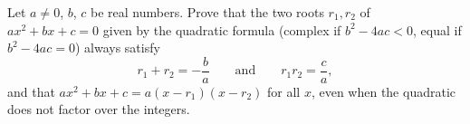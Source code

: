 Let $a\ne0$, $b$, $c$ be real numbers. Prove that the two roots $r_1,r_2$ of $ax^2+bx+c=0$ given by the quadratic formula (complex if $b^2-4ac<0$, equal if $b^2-4ac=0$) always satisfy
\[
r_1+r_2=-\dfrac{b}{a}\qquad\text{and}\qquad r_1r_2=\dfrac{c}{a},
\]
and that $ax^2+bx+c=a(x-r_1)(x-r_2)$ for all $x$, even when the quadratic does not factor over the integers.
